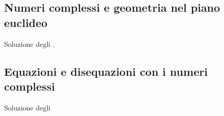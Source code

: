 \documentclass[letterpaper,10pt,italian]{jupyterBook}
\begin{document}
\subsection{Numeri complessi e geometria nel piano euclideo}
\label{\detokenize{ch/algebra/complex-algebra-sol:numeri-complessi-e-geometria-nel-piano-euclideo}}\label{\detokenize{ch/algebra/complex-algebra-sol:math-hs-algebra-complex-problems-geometry-2d-sol}}
\sphinxAtStartPar
Soluzione degli {\hyperref[\detokenize{ch/algebra/complex-algebra-problems:math-hs:algebra:complex:problems:geometry-2d:ex}]{}}.


\subsection{Equazioni e disequazioni con i numeri complessi}
\label{\detokenize{ch/algebra/complex-algebra-sol:equazioni-e-disequazioni-con-i-numeri-complessi}}\label{\detokenize{ch/algebra/complex-algebra-sol:math-hs-algebra-complex-problems-equations-sol}}
\sphinxAtStartPar
Soluzione degli {\hyperref[\detokenize{ch/algebra/complex-algebra-problems:math-hs-algebra-complex-problems-equations-sys}]{}}
\end{document}
